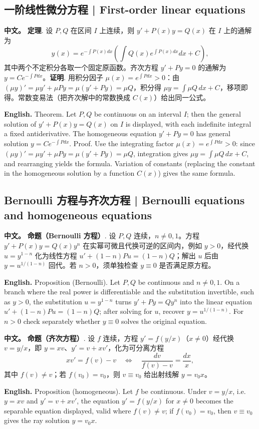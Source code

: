 \documentclass[UTF8,11pt,a4paper]{ctexart}
\newcommand{\APS}[2]{\par\noindent\textbf{中文。} #1\par\noindent\textbf{English.} #2\par}
\begin{document}
\subsection{一阶线性微分方程 | First-order linear equations}
\APS{\textbf{定理}. 设 $P,Q$ 在区间 $I$ 上连续，则 $y'+P(x)y=Q(x)$ 在 $I$ 上的通解为
\[
y(x)=e^{-\int P(x)dx}\left(\int Q(x)e^{\int P(x)dx}dx+C\right),
\]
其中两个不定积分各取一个固定原函数。齐次方程 $y'+Py=0$ 的通解为 $y=Ce^{-\int Pdx}$。\textbf{证明}. 用积分因子 $\mu(x)=e^{\int Pdx}>0$：由 $(\mu y)'=\mu y'+\mu Py=\mu(y'+Py)=\mu Q$，积分得 $\mu y=\int\mu Q\,dx+C$，移项即得。常数变易法（把齐次解中的常数换成 $C(x)$）给出同一公式。}{Theorem. Let $P,Q$ be continuous on an interval $I$; then the general solution of $y'+P(x)y=Q(x)$ on $I$ is displayed, with each indefinite integral a fixed antiderivative. The homogeneous equation $y'+Py=0$ has general solution $y=Ce^{-\int Pdx}$. Proof. Use the integrating factor $\mu(x)=e^{\int Pdx}>0$: since $(\mu y)'=\mu y'+\mu Py=\mu(y'+Py)=\mu Q$, integration gives $\mu y=\int\mu Q\,dx+C$, and rearranging yields the formula. Variation of constants (replacing the constant in the homogeneous solution by a function $C(x)$) gives the same formula.}
\subsection{Bernoulli 方程与齐次方程 | Bernoulli equations and homogeneous equations}
\APS{\textbf{命题（Bernoulli 方程）}. 设 $P,Q$ 连续，$n\ne0,1$。方程 $y'+P(x)y=Q(x)y^{n}$ 在实幂可微且代换可逆的区间内，例如 $y>0$，经代换 $u=y^{1-n}$ 化为线性方程 $u'+(1-n)Pu=(1-n)Q$；解出 $u$ 后由 $y=u^{1/(1-n)}$ 回代。若 $n>0$，须单独检查 $y\equiv0$ 是否满足原方程。}{Proposition (Bernoulli). Let $P,Q$ be continuous and $n\ne0,1$. On a branch where the real power is differentiable and the substitution invertible, such as $y>0$, the substitution $u=y^{1-n}$ turns $y'+Py=Qy^{n}$ into the linear equation $u'+(1-n)Pu=(1-n)Q$; after solving for $u$, recover $y=u^{1/(1-n)}$. For $n>0$ check separately whether $y\equiv0$ solves the original equation.}
\APS{\textbf{命题（齐次方程）}. 设 $f$ 连续，方程 $y'=f(y/x)$（$x\ne0$）经代换 $v=y/x$，即 $y=xv$、$y'=v+xv'$，化为可分离方程
\[
x v'=f(v)-v\quad\Longleftrightarrow\quad \frac{dv}{f(v)-v}=\frac{dx}{x},
\]
其中 $f(v)\ne v$；若 $f(v_0)=v_0$，则 $v\equiv v_0$ 给出射线解 $y=v_0x$。}{Proposition (homogeneous). Let $f$ be continuous. Under $v=y/x$, i.e. $y=xv$ and $y'=v+xv'$, the equation $y'=f(y/x)$ for $x\ne0$ becomes the separable equation displayed, valid where $f(v)\ne v$; if $f(v_0)=v_0$, then $v\equiv v_0$ gives the ray solution $y=v_0x$.}
\end{document}
